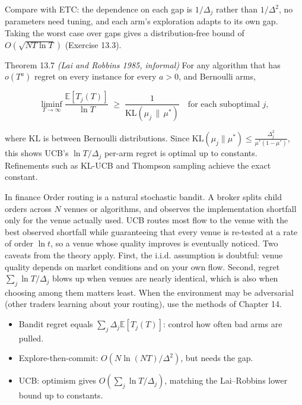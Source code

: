 \documentclass[11pt,a4paper,openany]{book}
\newcommand{\E}{\mathbb{E}}
\newcommand{\KL}{\mathrm{KL}}
\begin{document}
Compare with ETC: the dependence on each gap is $1/\Delta_j$ rather than $1/\Delta^2$, no parameters need tuning, and each arm's exploration adapts to its own gap. Taking the worst case over gaps gives a distribution-free bound of $O(\sqrt{NT\ln T})$ (Exercise 13.3).

\begin{bthm}{Theorem 13.7 \emph{(Lai and Robbins 1985, informal)}}
For any algorithm that has $o(T^a)$ regret on every instance for every $a>0$, and Bernoulli arms,

\[\liminf_{T\to\infty}\frac{\E[T_j(T)]}{\ln T}\;\ge\;\frac{1}{\KL(\mu_j\,\|\,\mu^*)}\quad\text{for each suboptimal }j,\]

where $\KL$ is between Bernoulli distributions. Since $\KL(\mu_j\|\mu^*)\le\frac{\Delta_j^2}{\mu^*(1-\mu^*)}$, this shows UCB's $\ln T/\Delta_j$ per-arm regret is optimal up to constants. Refinements such as KL-UCB and Thompson sampling achieve the exact constant.
\end{bthm}

\begin{bfin}{In finance}
Order routing is a natural stochastic bandit. A broker splits child orders across $N$ venues or algorithms, and observes the implementation shortfall only for the venue actually used. UCB routes most flow to the venue with the best observed shortfall while guaranteeing that every venue is re-tested at a rate of order $\ln t$, so a venue whose quality improves is eventually noticed. Two caveats from the theory apply. First, the i.i.d. assumption is doubtful: venue quality depends on market conditions and on your own flow. Second, regret $\sum_j\ln T/\Delta_j$ blows up when venues are nearly identical, which is also when choosing among them matters least. When the environment may be adversarial (other traders learning about your routing), use the methods of Chapter 14.
\end{bfin}

\begin{takeaways}
\begin{itemize}
\item Bandit regret equals $\sum_j\Delta_j\E[T_j(T)]$: control how often bad arms are pulled.
\item Explore-then-commit: $O(N\ln(NT)/\Delta^2)$, but needs the gap.
\item UCB: optimism gives $O(\sum_j\ln T/\Delta_j)$, matching the Lai–Robbins lower bound up to constants.
\end{itemize}
\end{takeaways}
\end{document}
